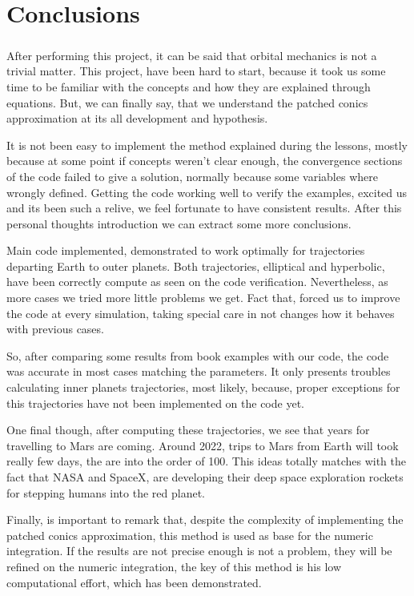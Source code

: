 \chapter{Conclusions}
\paragraph{} After performing this project, it can be said that orbital mechanics is not a trivial matter. This project, have been hard to start, because it took us some time to be familiar with the concepts and how they are explained through equations. But, we can finally say, that we understand the patched conics approximation at its all development and hypothesis.

It is not been easy to implement the method explained during the lessons, mostly because at some point if concepts weren't clear enough, the convergence sections of the code failed to give a solution, normally because some variables where wrongly defined. Getting the code working well to verify the examples, excited us and its been such a relive, we feel fortunate to have consistent results. After this personal thoughts introduction we can extract some more conclusions.

Main code implemented, demonstrated to work optimally for trajectories departing Earth to outer planets. Both trajectories, elliptical and hyperbolic, have been correctly compute as seen on the code verification. Nevertheless, as more cases we tried more little problems we get. Fact that, forced us to improve the code at every simulation, taking special care in not changes how it behaves with previous cases.

So, after comparing some results from book \cite{llibreVictor} examples with our code, the code was accurate in most cases matching the parameters. It only presents troubles calculating inner planets trajectories, most likely, because, proper exceptions for this trajectories have not been implemented on the code yet. 

One final though, after computing these trajectories, we see that years for travelling to Mars are coming. Around 2022, trips to Mars from Earth will took really few days, the are into the order of 100. This ideas totally matches with the fact that NASA and SpaceX, are developing their deep space exploration rockets for stepping humans into the red planet.

Finally, is important to remark that, despite the complexity of implementing the patched conics approximation, this method is used as base for the numeric integration. If the results are not precise enough is not a problem, they will be refined on the numeric integration, the key of this method is his low computational effort, which has been demonstrated.